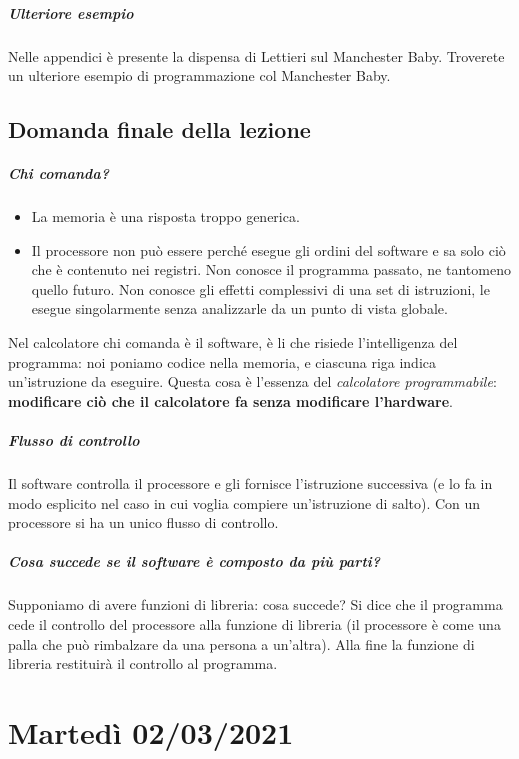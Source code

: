\documentclass[11pt]{report}
\theoremstyle{definition}
\begin{document}
\paragraph{Ulteriore esempio} Nelle appendici è presente la dispensa di Lettieri sul Manchester Baby. Troverete un ulteriore esempio di programmazione col Manchester Baby.
\clearpage
\section{Domanda finale della lezione}
\paragraph{Chi comanda?}
\begin{itemize}
\item La memoria è una risposta troppo generica.
\item Il processore non può essere perché esegue gli ordini del software e sa solo ciò che è contenuto nei registri. Non conosce il programma passato, ne tantomeno quello futuro. Non conosce gli effetti complessivi di una set di istruzioni, le esegue singolarmente senza analizzarle da un punto di vista globale.
\end{itemize}
Nel calcolatore chi comanda è il software, è li che risiede l'intelligenza del programma: noi poniamo codice nella memoria, e ciascuna riga indica un'istruzione da eseguire. Questa cosa è l'essenza del \emph{calcolatore programmabile}:  \textbf{modificare ciò che il calcolatore fa senza modificare l'hardware}.
\paragraph{Flusso di controllo} Il software controlla il processore e gli fornisce l'istruzione successiva (e lo fa in modo esplicito nel caso in cui voglia compiere un'istruzione di salto). Con un processore si ha un unico flusso di controllo.
\paragraph{Cosa succede se  il software è composto da più parti?} Supponiamo di avere funzioni di libreria: cosa succede? Si dice che il programma cede il controllo del processore alla funzione di libreria (il processore è come una palla che può rimbalzare da una persona a un'altra). Alla fine la funzione di libreria restituirà il controllo al programma.

\chapter{Martedì 02/03/2021}
\end{document}
